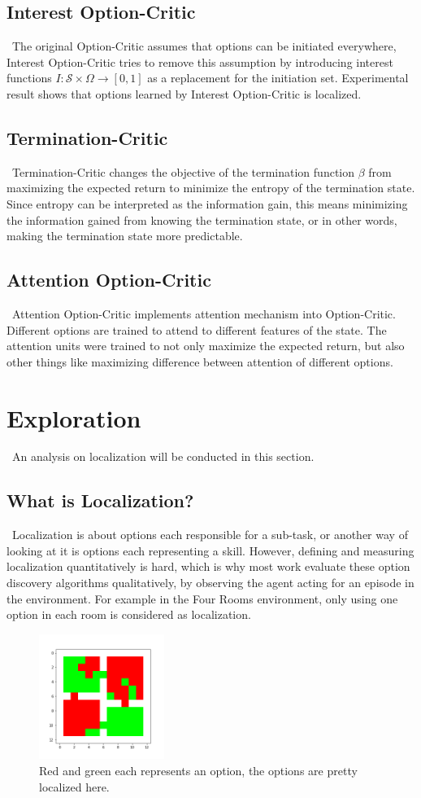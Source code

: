 \documentclass{article}
\begin{document}
	\subsection*{Interest Option-Critic}
	\qquad \ The original Option-Critic assumes that options can be initiated everywhere, Interest Option-Critic \cite{khetarpal2020options} tries to remove this assumption by introducing interest functions $I:\mathcal{S} \times \Omega \rightarrow [0,1]$ as a replacement for the initiation set. Experimental result shows that options learned by Interest Option-Critic is localized.
	\subsection*{Termination-Critic}
	\qquad \ Termination-Critic \cite{harutyunyan2019termination} changes the objective of the termination function $\beta$ from maximizing the expected return to minimize the entropy of the termination state. Since entropy can be interpreted as the information gain, this means minimizing the information gained from knowing the termination state, or in other words, making the termination state more predictable.
	\subsection*{Attention Option-Critic}
	\qquad \ Attention Option-Critic \cite{attentionoptioncritic} implements attention mechanism into Option-Critic. Different options are trained to attend to different features of the state. The attention units were trained to not only maximize the expected return, but also other things like maximizing difference between attention of different options.
	\section{Exploration}
	\qquad \ An analysis on localization will be conducted in this section.
	\subsection*{What is Localization?}
	\qquad \ Localization is about options each responsible for a sub-task, or another way of looking at it is options each representing a skill. However, defining and measuring localization quantitatively is hard, which is why most work evaluate these option discovery algorithms qualitatively, by observing the agent acting for an episode in the environment. For example in the Four Rooms environment, only using one option in each room is considered as localization.
	\begin{figure}[h]
		\centering
		\includegraphics[width=1.6in]{cherryPicked.png}
		\caption{Red and green each represents an option, the options are pretty localized here.}
	\end{figure}
\end{document}
